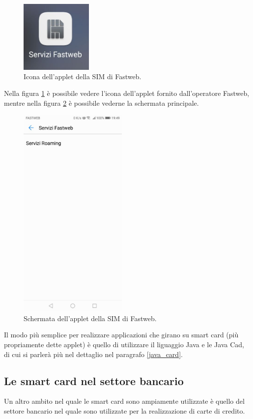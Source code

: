 \begin{figure}[h!]
  \centering
  \includegraphics[width=100pt]{pictures/icona_aplet_fastweb.jpg}
  \caption{Icona dell'applet della SIM di Fastweb.}
  \label{fig:app_icon}
\end{figure}

Nella figura \ref{fig:app_icon} è possibile vedere l'icona dell'applet fornito dall'operatore Fastweb, mentre nella figura \ref{fig:app_screen} è possibile vederne la schermata principale.

\begin{figure}[h!]
  \centering
  \includegraphics[width=150pt]{pictures/screen_aplet_fastweb.jpg}
  \caption{Schermata dell'applet della SIM di Fastweb.}
  \label{fig:app_screen}
\end{figure}

Il modo più semplice per realizzare applicazioni che girano su smart card (più propriamente dette applet) è quello di utilizzare il liguaggio Java e le Java Cad, di cui si parlerà più nel dettaglio nel paragrafo \ref{java_card}.
\cite{secret_life}

\subsection{Le smart card nel settore bancario}
\label{carta_di_credito}
Un altro ambito nel quale le smart card sono ampiamente utilizzate è quello del settore bancario nel quale sono utilizzate per la realizzazione di carte di credito.

